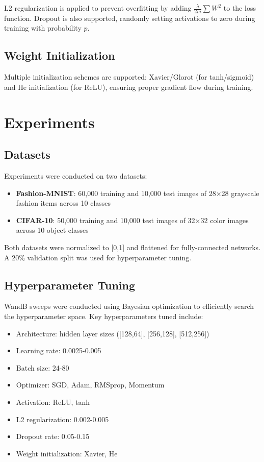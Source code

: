 \documentclass[11pt,a4paper]{article}
\begin{document}
L2 regularization is applied to prevent overfitting by adding $\frac{\lambda}{2m} \sum W^2$ to the loss function. Dropout is also supported, randomly setting activations to zero during training with probability $p$.

\subsection{Weight Initialization}

Multiple initialization schemes are supported: Xavier/Glorot (for tanh/sigmoid) and He initialization (for ReLU), ensuring proper gradient flow during training.

\section{Experiments}

\subsection{Datasets}

Experiments were conducted on two datasets:
\begin{itemize}
\item \textbf{Fashion-MNIST}: 60,000 training and 10,000 test images of 28×28 grayscale fashion items across 10 classes
\item \textbf{CIFAR-10}: 50,000 training and 10,000 test images of 32×32 color images across 10 object classes
\end{itemize}

Both datasets were normalized to [0,1] and flattened for fully-connected networks. A 20\% validation split was used for hyperparameter tuning.

\subsection{Hyperparameter Tuning}

WandB sweeps were conducted using Bayesian optimization to efficiently search the hyperparameter space. Key hyperparameters tuned include:
\begin{itemize}
\item Architecture: hidden layer sizes ([128,64], [256,128], [512,256])
\item Learning rate: 0.0025-0.005
\item Batch size: 24-80
\item Optimizer: SGD, Adam, RMSprop, Momentum
\item Activation: ReLU, tanh
\item L2 regularization: 0.002-0.005
\item Dropout rate: 0.05-0.15
\item Weight initialization: Xavier, He
\end{itemize}
\end{document}
